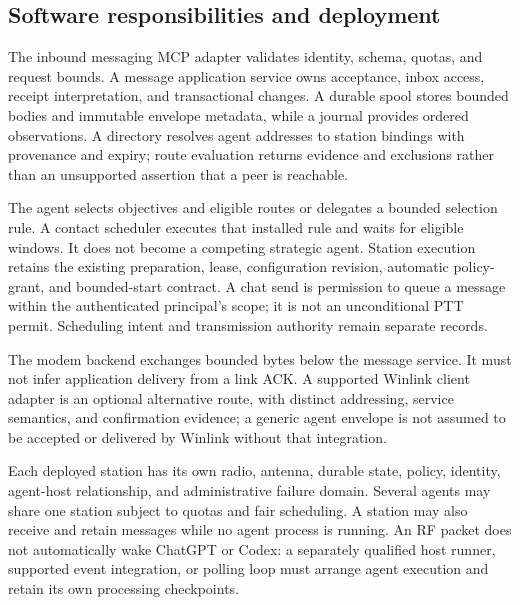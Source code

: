 
\subsection{Software responsibilities and deployment}
The inbound messaging MCP adapter validates identity, schema, quotas, and
request bounds. A message application service owns acceptance, inbox access,
receipt interpretation, and transactional changes. A durable spool stores
bounded bodies and immutable envelope metadata, while a journal provides
ordered observations. A directory resolves agent addresses to station
bindings with provenance and expiry; route evaluation returns evidence and
exclusions rather than an unsupported assertion that a peer is reachable.

The agent selects objectives and eligible routes or delegates a bounded
selection rule. A contact scheduler executes that installed rule and waits
for eligible windows. It does not become a competing strategic agent.
Station execution retains the existing preparation, lease, configuration
revision, automatic policy-grant, and bounded-start contract. A chat send is
permission to queue a message within the authenticated principal's scope;
it is not an unconditional PTT permit. Scheduling intent and transmission
authority remain separate records.

The modem backend exchanges bounded bytes below the message service. It
must not infer application delivery from a link ACK. A supported Winlink
client adapter is an optional alternative route, with distinct addressing,
service semantics, and confirmation evidence; a generic agent envelope is
not assumed to be accepted or delivered by Winlink without that integration.

Each deployed station has its own radio, antenna, durable state, policy,
identity, agent-host relationship, and administrative failure domain. Several
agents may share one station subject to quotas and fair scheduling. A station
may also receive and retain messages while no agent process is running.
An RF packet does not automatically wake ChatGPT or Codex: a separately
qualified host runner, supported event integration, or polling loop must
arrange agent execution and retain its own processing checkpoints.

